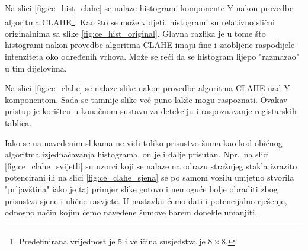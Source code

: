 \documentclass[times, utf8, diplomski]{fer}
\begin{document}
\bigskip

Na slici \ref{fig:ce_hist_clahe} se nalaze histogrami komponente Y nakon provedbe algoritma CLAHE\footnote{Predefinirana vrijednost je 5 i veličina susjedstva je $8 \times 8$.}. Kao što se može vidjeti, histogrami su relativno slični originalnima sa slike \ref{fig:ce_hist_original}. Glavna razlika je u tome što histogrami nakon provedbe algoritma CLAHE imaju fine i zaobljene raspodijele intenziteta oko određenih vrhova. Može se reći da se histogram lijepo "razmazao" u tim dijelovima.

Na slici \ref{fig:ce_clahe} se nalaze slike nakon provedbe algoritma CLAHE nad Y komponentom. Sada se tamnije slike već puno lakše mogu raspoznati. Ovakav pristup je korišten u konačnom sustavu za detekciju i raspoznavanje registarskih tablica.

Iako se na navedenim slikama ne vidi toliko prisustvo šuma kao kod običnog algoritma izjednačavanja histograma, on je i dalje prisutan. Npr.\ na slici \ref{fig:ce_clahe_svijetli} su uzorci koji se nalaze na odrazu stražnjeg stakla izrazito potencirani ili na slici \ref{fig:ce_clahe_sjena} se po samom vozilu umjetno stvorila "prljavština" iako je taj primjer slike gotovo i nemoguće bolje obraditi zbog prisustva sjene i ulične rasvjete. U nastavku ćemo dati i potencijalno rješenje, odnosno način kojim ćemo navedene šumove barem donekle umanjiti.
\end{document}

